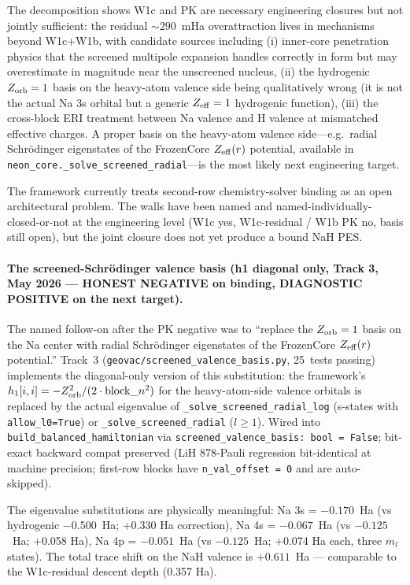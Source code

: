 \documentclass[aps,pra,twocolumn,superscriptaddress,longbibliography]{revtex4-2}
\begin{document}
The decomposition shows W1c and PK are necessary engineering
closures but not jointly sufficient: the residual ${\sim}290$~mHa
overattraction lives in mechanisms beyond W1c+W1b, with candidate
sources including (i) inner-core penetration physics that the
screened multipole expansion handles correctly in form but may
overestimate in magnitude near the unscreened nucleus,
(ii) the hydrogenic $Z_{\rm orb} = 1$ basis on the heavy-atom
valence side being qualitatively wrong (it is not the actual
Na 3s orbital but a generic $Z_{\rm eff} = 1$ hydrogenic function),
(iii) the cross-block ERI treatment between Na valence and H
valence at mismatched effective charges. A proper basis on the
heavy-atom valence side---e.g.\ radial Schr\"odinger eigenstates
of the FrozenCore $Z_{\rm eff}(r)$ potential, available in
\texttt{neon\_core.\_solve\_screened\_radial}---is the most
likely next engineering target.

The framework currently treats second-row chemistry-solver
binding as an open architectural problem. The walls have been
named and named-individually-closed-or-not at the engineering
level (W1c yes, W1c-residual / W1b PK no, basis still open),
but the joint closure does not yet produce a bound NaH PES.

\paragraph{The screened-Schr\"odinger valence basis (h1 diagonal only,
Track 3, May 2026 --- HONEST NEGATIVE on binding, DIAGNOSTIC POSITIVE
on the next target).}
The named follow-on after the PK negative was to ``replace the
$Z_{\rm orb} = 1$ basis on the Na center with radial Schr\"odinger
eigenstates of the FrozenCore $Z_{\rm eff}(r)$ potential.'' Track~3
(\texttt{geovac/screened\_valence\_basis.py}, 25~tests passing) implements
the diagonal-only version of this substitution: the framework's
$h_1[i,i] = -Z_{\rm orb}^2 / (2 \cdot \text{block}\_n^2)$ for the
heavy-atom-side valence orbitals is replaced by the actual eigenvalue
of \texttt{\_solve\_screened\_radial\_log} (s-states with
\texttt{allow\_l0=True}) or \texttt{\_solve\_screened\_radial}
($l \geq 1$). Wired into \texttt{build\_balanced\_hamiltonian} via
\texttt{screened\_valence\_basis: bool = False}; bit-exact backward
compat preserved (LiH 878-Pauli regression bit-identical at machine
precision; first-row blocks have \texttt{n\_val\_offset = 0} and are
auto-skipped).

The eigenvalue substitutions are physically meaningful:
Na 3s = $-0.170$~Ha (vs hydrogenic $-0.500$~Ha; +0.330 Ha correction),
Na 4s = $-0.067$~Ha (vs $-0.125$~Ha; +0.058 Ha),
Na 4p = $-0.051$~Ha (vs $-0.125$~Ha; +0.074 Ha each, three $m_l$ states).
The total trace shift on the NaH valence is $+0.611$~Ha --- comparable
to the W1c-residual descent depth (0.357 Ha).
\end{document}
